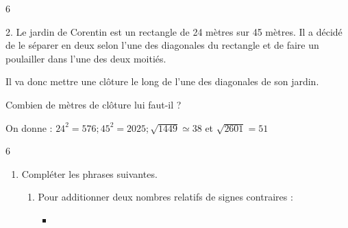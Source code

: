\documentclass[a4paper]{book}
\begin{document}
{\begin{exerciceNote}{6}
        \vspace{1cm}

        2. Le jardin de Corentin est un rectangle de 24 mètres sur 45 mètres. Il a décidé de le séparer en deux selon l'une des diagonales du rectangle et de faire un poulailler dans l'une des deux moitiés. 
        
        Il va donc mettre une clôture le long de l'une des diagonales de son jardin.

        \medskip
        
        Combien de mètres de clôture lui faut-il ?

        \medskip

        On donne : $24^2=576; 45^2=2025; \sqrt{1449}\simeq38$ et $\sqrt{2601}=51$

        \bigskip

        \begin{minipage}{0.8\linewidth}
            \points[190]
        \end{minipage}
        \vline
        \hfill
        \begin{minipage}{0.19\linewidth}
        
        \end{minipage} 
    \end{exerciceNote}


\newpage

\setcounter{exo}{1}
\raggedright
\NomPrenom 
{}

\TableauCompetencesQuatre
            {\CompetenceSept}
            {}
            {}
            {}
            

    \begin{exerciceNote}{6}
        \begin{enumerate}
            \item Compléter les phrases suivantes.
    
            \begin{enumerate}
                \item Pour additionner deux nombres relatifs de signes contraires :
    
                \medskip
            
                \begin{itemize}
                    \item \points[30]
    
                    \medskip
                    

\end{itemize}
\end{enumerate}
\end{enumerate}
\end{exerciceNote}}
\end{document}
